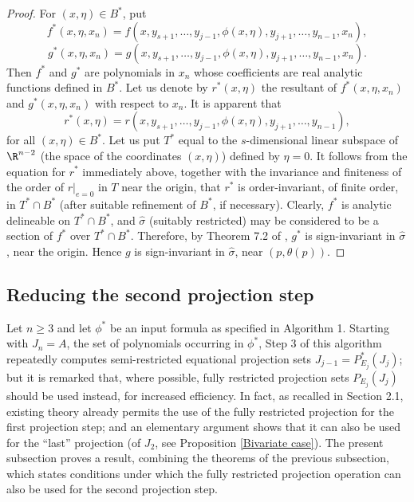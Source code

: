 \documentclass{article}
\begin{document}
\begin{proof}
    For $(x, \eta) \in B^*$, put
    \[f^*(x, \eta, x_n) = f(x, y_{s+1}, \ldots, y_{j-1}, \phi(x, \eta),
                               y_{j+1}, \ldots, y_{n-1}, x_n),\]
    \[g^*(x, \eta, x_n) = g(x, y_{s+1}, \ldots, y_{j-1}, \phi(x, \eta),
                               y_{j+1}, \ldots, y_{n-1}, x_n).\]
    Then $f^*$ and $g^*$ are polynomials in $x_n$ whose coefficients
    are real analytic functions defined in $B^*$. Let us denote by
    $r^*(x, \eta)$ the resultant of $f^*(x, \eta, x_n)$ and
    $g^*(x, \eta, x_n)$ with respect to $x_n$. It is apparent that
    \[r^*(x, \eta) = r(x, y_{s+1}, \ldots, y_{j-1}, \phi(x, \eta),
                          y_{j+1}, \ldots, y_{n-1}),\]
    for all $(x, \eta) \in B^*$. Let us put $T^*$ equal to the
    $s$-dimensional linear subspace of $\R^{n-2}$ (the space of the
    coordinates $(x, \eta)$) defined by $\eta = 0$.
    It follows from the equation for $r^*$ immediately above,
    together with the invariance and finiteness of the order
    of $r|_{e=0}$ in $T$ near the origin, that $r^*$ is
    order-invariant, of finite order, in $T^* \cap B^*$
    (after suitable refinement of $B^*$, if necessary).
    Clearly, $f^*$ is analytic delineable on $T^* \cap B^*$,
    and $\hat{\sigma}$ (suitably restricted)
    may be considered to be a section of $f^*$ over
    $T^* \cap B^*$. Therefore, by Theorem 7.2 of
    \cite{McCallum2001}, $g^*$ is sign-invariant in $\hat{\sigma}$,
    near the origin. Hence $g$ is sign-invariant in $\hat{\sigma}$,
    near $(p, \theta(p))$.
\end{proof}

\subsection{Reducing the second projection step}
Let $n \ge 3$ and let $\phi^*$ be an input formula as
specified in Algorithm 1. Starting with $J_n = A$, the set of polynomials
occurring in $\phi^*$,
Step 3 of this algorithm repeatedly computes semi-restricted equational
projection sets $J_{j-1} = P_{E_j}^*(J_j)$; 
but it is remarked that, where possible,
fully restricted projection sets $P_{E_j}(J_j)$ should be used instead, 
for increased efficiency.
In fact, as recalled in Section 2.1, existing theory \cite{McCallum1999}
already permits the use of the fully restricted projection for the
first projection step; and an elementary argument 
shows that it can also be used for the ``last'' projection (of $J_2$,
see Proposition \ref{Bivariate case}).
The present subsection proves a result, combining the theorems of the
previous subsection, which states conditions under which the fully
restricted projection operation can also be used for the second projection
step.
\end{document}
